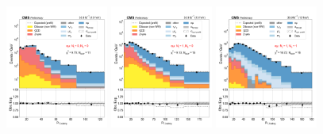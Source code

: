 \begin{figure}[htb!]
    \centering
    \includegraphics[width=0.3\textwidth]{chapters/Analysis/sectionStatisticalAnalysis/figures/fit/emu_cat_eq0_eq0_a}
    \includegraphics[width=0.3\textwidth]{chapters/Analysis/sectionStatisticalAnalysis/figures/fit/emu_cat_eq1_eq0_a}
    \includegraphics[width=0.3\textwidth]{chapters/Analysis/sectionStatisticalAnalysis/figures/fit/emu_cat_eq1_eq1_a}


\end{figure}
